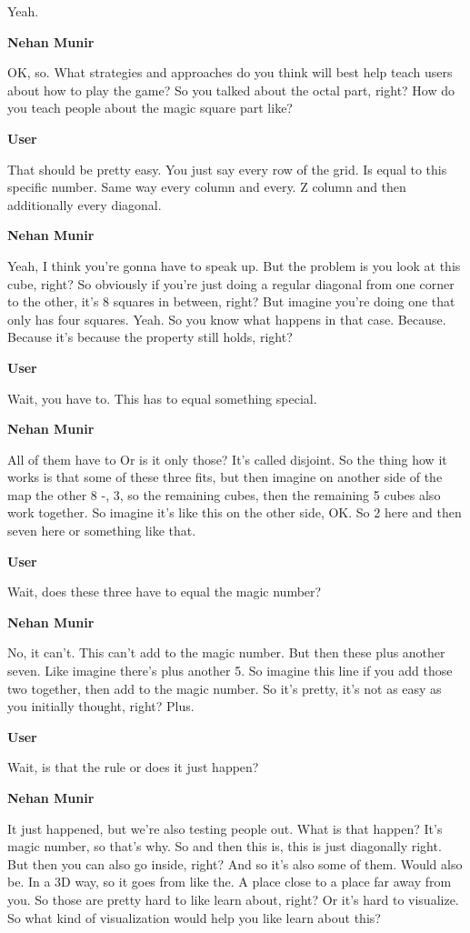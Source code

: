 \documentclass{article}
\begin{document}
Yeah.

\noindent \textbf{Nehan Munir}

OK, so. What strategies and approaches do you think will best help teach users about how to play the game? So you talked about the octal part, right? How do you teach people about the magic square part like?

\noindent \textbf{User}

That should be pretty easy. You just say every row of the grid. Is equal to this specific number. Same way every column and every. Z column and then additionally every diagonal.

\noindent \textbf{Nehan Munir}

Yeah, I think you're gonna have to speak up. But the problem is you look at this cube, right? So obviously if you're just doing a regular diagonal from one corner to the other, it's 8 squares in between, right? But imagine you're doing one that only has four squares. Yeah. So you know what happens in that case. Because. Because it's because the property still holds, right?

\noindent \textbf{User}

Wait, you have to. This has to equal something special.

\noindent \textbf{Nehan Munir}

All of them have to Or is it only those? It's called disjoint. So the thing how it works is that some of these three fits, but then imagine on another side of the map the other 8 -, 3, so the remaining cubes, then the remaining 5 cubes also work together. So imagine it's like this on the other side, OK. So 2 here and then seven here or something like that.

\noindent \textbf{User}

Wait, does these three have to equal the magic number?

\noindent \textbf{Nehan Munir}

No, it can't. This can't add to the magic number. But then these plus another seven. Like imagine there's plus another 5. So imagine this line if you add those two together, then add to the magic number. So it's pretty, it's not as easy as you initially thought, right? Plus.

\noindent \textbf{User}

Wait, is that the rule or does it just happen?

\noindent \textbf{Nehan Munir}

It just happened, but we're also testing people out. What is that happen? It's magic number, so that's why. So and then this is, this is just diagonally right. But then you can also go inside, right? And so it's also some of them. Would also be. In a 3D way, so it goes from like the. A place close to a place far away from you. So those are pretty hard to like learn about, right? Or it's hard to visualize. So what kind of visualization would help you like learn about this?
\end{document}
